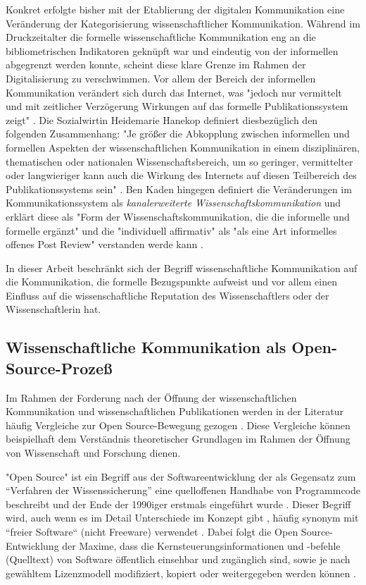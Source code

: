 Konkret erfolgte bisher mit der Etablierung der digitalen Kommunikation eine Veränderung der Kategorisierung wissenschaftlicher Kommunikation. Während im Druckzeitalter die formelle wissenschaftliche Kommunikation eng an die bibliometrischen Indikatoren geknüpft war und eindeutig von der informellen abgegrenzt werden konnte, scheint diese klare Grenze im Rahmen der Digitalisierung zu verschwimmen. Vor allem der Bereich der informellen Kommunikation verändert sich durch das Internet, was "jedoch nur vermittelt und mit zeitlicher Verzögerung Wirkungen auf das formelle Publikationssystem zeigt" \cite{Hanekop_2014}. Die Sozialwirtin Heidemarie Hanekop definiert diesbezüglich den folgenden Zusammenhang: "Je größer die Abkopplung zwischen informellen und formellen Aspekten der wissenschaftlichen Kommunikation in einem disziplinären, thematischen oder nationalen Wissenschaftsbereich, um so geringer, vermittelter oder langwieriger kann auch die Wirkung des Internets auf diesen Teilbereich des Publikationssystems sein" \cite{Hanekop_2014}. Ben Kaden hingegen definiert die Veränderungen im Kommunikationssystem als \textit{kanalerweiterte Wissenschaftskommunikation} und erklärt diese als "Form der Wissenschaftskommunikation, die die informelle und formelle ergänzt" und die "individuell affirmativ" als "als eine Art informelles offenes Post Review" verstanden werde kann \cite{kaden_2009_library}.

In dieser Arbeit beschränkt sich der Begriff wissenschaftliche Kommunikation auf die Kommunikation, die formelle Bezugspunkte aufweist und vor allem einen Einfluss auf die wissenschaftliche Reputation des Wissenschaftlers oder der Wissenschaftlerin hat.

\subsection{Wissenschaftliche Kommunikation als Open-Source-Prozeß}
Im Rahmen der Forderung nach der Öffnung der wissenschaftlichen Kommunikation und wissenschaftlichen Publikationen werden in der Literatur häufig Vergleiche zur Open Source-Bewegung gezogen \cite{suchen}. Diese Vergleiche können beispielhaft dem Verständnis theoretischer Grundlagen im Rahmen der Öffnung von Wissenschaft und Forschung dienen.

"Open Source" ist ein Begriff aus der Softwareentwicklung der als Gegensatz zum “Verfahren der Wissenssicherung” \cite{stallman2002} eine quelloffenen Handhabe von Programmcode beschreibt und der Ende der 1990iger erstmals eingeführt wurde  \cite{suchen}. Dieser Begriff wird, auch wenn es im Detail Unterschiede im Konzept gibt \cite{suchen}, häufig synonym mit “freier Software“ (nicht Freeware) verwendet \cite{suchen}. Dabei folgt die Open Source-Entwicklung der Maxime, dass die Kernsteuerungsinformationen und -befehle (Quelltext) von Software öffentlich einsehbar und zugänglich sind, sowie je nach gewähltem Lizenzmodell modifiziert, kopiert oder weitergegeben werden können \cite{suchen}.

